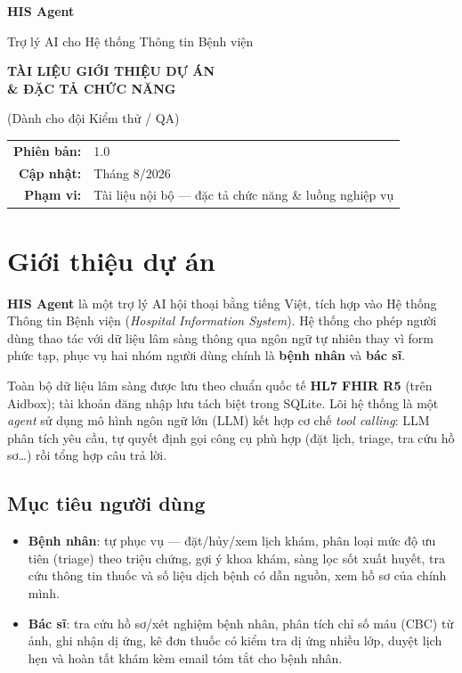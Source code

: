 \documentclass[a4paper,12pt]{article}
\begin{document}
\begin{titlepage}
\centering
\vspace*{3cm}
{\Huge\bfseries HIS Agent\par}
\vspace{0.6cm}
{\LARGE Trợ lý AI cho Hệ thống Thông tin Bệnh viện\par}
\vspace{2cm}
{\Large\bfseries TÀI LIỆU GIỚI THIỆU DỰ ÁN\\[4pt] \& ĐẶC TẢ CHỨC NĂNG\par}
\vspace{0.4cm}
{\large (Dành cho đội Kiểm thử / QA)\par}
\vspace{3cm}
\begin{tabular}{rl}
\textbf{Phiên bản:} & 1.0 \\[4pt]
\textbf{Cập nhật:}  & Tháng 8/2026 \\[4pt]
\textbf{Phạm vi:}   & Tài liệu nội bộ --- đặc tả chức năng \& luồng nghiệp vụ \\
\end{tabular}
\vfill
\end{titlepage}

\tableofcontents
\newpage

\section{Giới thiệu dự án}

\textbf{HIS Agent} là một trợ lý AI hội thoại bằng tiếng Việt, tích hợp vào Hệ thống Thông tin Bệnh viện (\textit{Hospital Information System}). Hệ thống cho phép người dùng thao tác với dữ liệu lâm sàng thông qua ngôn ngữ tự nhiên thay vì form phức tạp, phục vụ hai nhóm người dùng chính là \textbf{bệnh nhân} và \textbf{bác sĩ}.

Toàn bộ dữ liệu lâm sàng được lưu theo chuẩn quốc tế \textbf{HL7 FHIR R5} (trên Aidbox); tài khoản đăng nhập lưu tách biệt trong SQLite. Lõi hệ thống là một \textit{agent} sử dụng mô hình ngôn ngữ lớn (LLM) kết hợp cơ chế \textit{tool calling}: LLM phân tích yêu cầu, tự quyết định gọi công cụ phù hợp (đặt lịch, triage, tra cứu hồ sơ\ldots) rồi tổng hợp câu trả lời.

\subsection{Mục tiêu người dùng}
\begin{itemize}[leftmargin=1.4em]
  \item \textbf{Bệnh nhân}: tự phục vụ --- đặt/hủy/xem lịch khám, phân loại mức độ ưu tiên (triage) theo triệu chứng, gợi ý khoa khám, sàng lọc sốt xuất huyết, tra cứu thông tin thuốc và số liệu dịch bệnh có dẫn nguồn, xem hồ sơ của chính mình.
  \item \textbf{Bác sĩ}: tra cứu hồ sơ/xét nghiệm bệnh nhân, phân tích chỉ số máu (CBC) từ ảnh, ghi nhận dị ứng, kê đơn thuốc có kiểm tra dị ứng nhiều lớp, duyệt lịch hẹn và hoàn tất khám kèm email tóm tắt cho bệnh nhân.
\end{itemize}
\end{document}
